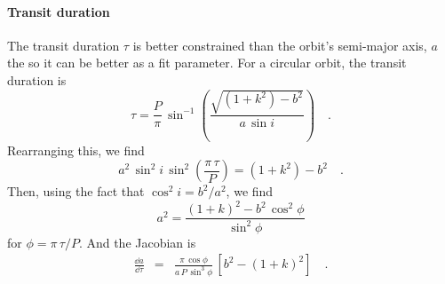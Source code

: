 \paragraph{Transit duration}
The transit duration $\tau$ is better constrained than the orbit's semi-major axis, $a$ the so it can be better as a fit parameter.
For a circular orbit, the transit duration is \citep{Winn:2010}
\begin{equation}
  \tau = \frac{P}{\pi}\,\sin^{-1}\left( \frac{\sqrt{(1 + k^2) - b^2}}{a\,\sin i} \right) \quad.
\end{equation}
Rearranging this, we find
\begin{equation}
  a^2\,\sin^2 i\,\sin^2\left(\frac{\pi\,\tau}{P}\right) = (1 + k^2) - b^2 \quad.
\end{equation}
Then, using the fact that $\cos^2 i = b^2 / a^2$, we find
\begin{equation}
  a^2 = \frac{(1 + k)^2 - b^2\,\cos^2\phi}{\sin^2\phi}
\end{equation}
for $\phi = \pi\,\tau / P$.
And the Jacobian is
\begin{eqnarray}
  \frac{\dd a}{\dd \tau} &=& \frac{\pi\,\cos \phi}{a\,P\,\sin^3 \phi}\,\left[b^2 - (1 + k)^2\right] \quad.
\end{eqnarray}


